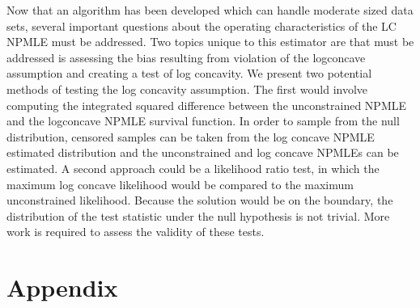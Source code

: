 \documentclass[10pt]{article}
\begin{document}
	Now that an algorithm has been developed which can handle moderate sized data sets, several important questions about the operating characteristics of the LC NPMLE must be addressed. Two topics unique to this estimator are that must be addressed is assessing the bias resulting from violation of the logconcave assumption and creating a test of log concavity. We present two potential methods of testing the log concavity assumption. The first would involve computing the integrated squared difference between the unconstrained NPMLE and the logconcave NPMLE survival function. In order to sample from the null distribution, censored samples can be taken from the log concave NPMLE estimated distribution and the unconstrained and log concave NPMLEs can be estimated. A second approach could be a likelihood ratio test, in which the maximum log concave likelihood would be compared to the maximum unconstrained likelihood. Because the solution would be on the boundary, the distribution of the test statistic under the null hypothesis is not trivial. More work is required to assess the validity of these tests.  

{\section{Appendix} } 


	
	
\end{document}

